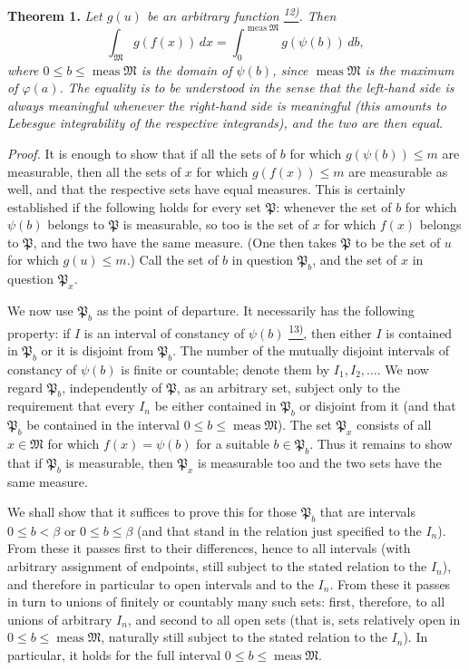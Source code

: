 \documentclass[12pt,b5paper,twoside]{article}
\newcommand{\noteref}[1]{%
  \hyperlink{note:#1}{\textsuperscript{#1)}}}
\begin{document}
\label{thm:1}
\noindent\textbf{Theorem 1.} \emph{Let $g(u)$ be an arbitrary function\noteref{12}. Then}
\label{eq:thm1-equiintegrability}
\begin{equation*}
  \int_{\mathfrak M} g(f(x))\,dx
  =\int_{0}^{\operatorname{meas}\mathfrak M} g(\psi(b))\,db,
\end{equation*}
\emph{where $0\leq b\leq\operatorname{meas}\mathfrak M$ is the domain of $\psi(b)$, since $\operatorname{meas}\mathfrak M$ is the maximum of $\varphi(a)$. The equality is to be understood in the sense that the left-hand side is always meaningful whenever the right-hand side is meaningful (this amounts to Lebesgue integrability of the respective integrands), and the two are then equal.}

\textit{Proof.} It is enough to show that if all the sets of $b$ for which $g(\psi(b))\leq m$ are measurable, then all the sets of $x$ for which $g(f(x))\leq m$ are measurable as well, and that the respective sets have equal measures. This is certainly established if the following holds for every set $\mathfrak P$: whenever the set of $b$ for which $\psi(b)$ belongs to $\mathfrak P$ is measurable, so too is the set of $x$ for which $f(x)$ belongs to $\mathfrak P$, and the two have the same measure. (One then takes $\mathfrak P$ to be the set of $u$ for which $g(u)\leq m$.) Call the set of $b$ in question $\mathfrak P_b$, and the set of $x$ in question $\mathfrak P_x$.

We now use $\mathfrak P_b$ as the point of departure. It necessarily has the following property: if $I$ is an interval of constancy of $\psi(b)$\noteref{13}, then either $I$ is contained in $\mathfrak P_b$ or it is disjoint from $\mathfrak P_b$. The number of the mutually disjoint intervals of constancy of $\psi(b)$ is finite or countable; denote them by $I_1,I_2,\ldots$. We now regard $\mathfrak P_b$, independently of $\mathfrak P$, as an arbitrary set, subject only to the requirement that every $I_n$ be either contained in $\mathfrak P_b$ or disjoint from it (and that $\mathfrak P_b$ be contained in the interval $0\leq b\leq\operatorname{meas}\mathfrak M$). The set $\mathfrak P_x$ consists of all $x\in\mathfrak M$ for which $f(x)=\psi(b)$ for a suitable $b\in\mathfrak P_b$. Thus it remains to show that if $\mathfrak P_b$ is measurable, then $\mathfrak P_x$ is measurable too and the two sets have the same measure.

We shall show that it suffices to prove this for those $\mathfrak P_b$ that are intervals $0\leq b<\beta$ or $0\leq b\leq\beta$ (and that stand in the relation just specified to the $I_n$). From these it passes first to their differences, hence to all intervals (with arbitrary assignment of endpoints, still subject to the stated relation to the $I_n$), and therefore in particular to open intervals and to the $I_n$. From these it passes in turn to unions of finitely or countably many such sets: first, therefore, to all unions of arbitrary $I_n$, and second to all open sets (that is, sets relatively open in $0\leq b\leq\operatorname{meas}\mathfrak M$, naturally still subject to the stated relation to the $I_n$). In particular, it holds for the full interval $0\leq b\leq\operatorname{meas}\mathfrak M$.
\end{document}
